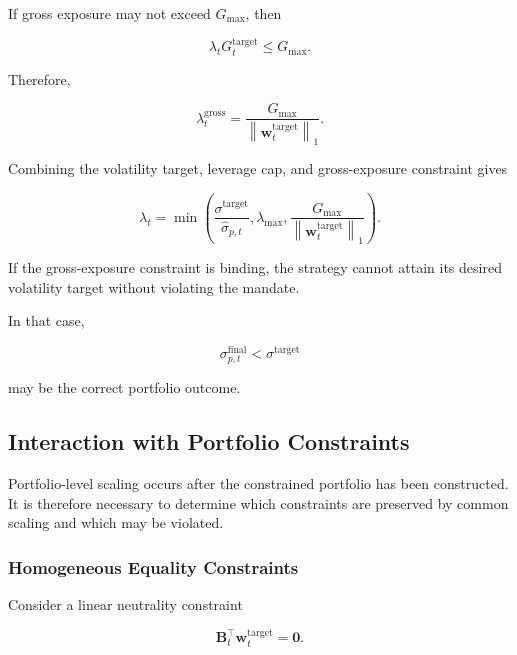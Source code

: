 \documentclass[11pt,a4paper]{article}
\begin{document}
If gross exposure may not exceed $G_{\max}$, then

\begin{equation}
\lambda_t
G_t^{\mathrm{target}}
\leq
G_{\max}.
\end{equation}

Therefore,

\begin{equation}
\boxed{
\lambda_t^{\mathrm{gross}}
=
\frac{
G_{\max}
}{
\left\|
\mathbf{w}_t^{\mathrm{target}}
\right\|_1
}.
}
\end{equation}

Combining the volatility target, leverage cap, and gross-exposure constraint
gives

\begin{equation}
\boxed{
\lambda_t
=
\min
\left(
\frac{
\sigma^{\mathrm{target}}
}{
\widehat{\sigma}_{p,t}
},
\lambda_{\max},
\frac{
G_{\max}
}{
\left\|
\mathbf{w}_t^{\mathrm{target}}
\right\|_1
}
\right).
}
\end{equation}

If the gross-exposure constraint is binding, the strategy cannot attain its
desired volatility target without violating the mandate.

In that case,

\begin{equation}
\boxed{
\sigma_{p,t}^{\mathrm{final}}
<
\sigma^{\mathrm{target}}
}
\end{equation}

may be the correct portfolio outcome.


\subsection{Interaction with Portfolio Constraints}
\label{subsec:risk_scaling_constraints}

Portfolio-level scaling occurs after the constrained portfolio has been
constructed. It is therefore necessary to determine which constraints are
preserved by common scaling and which may be violated.


\subsubsection{Homogeneous Equality Constraints}

Consider a linear neutrality constraint

\begin{equation}
\mathbf{B}_t^\top
\mathbf{w}_t^{\mathrm{target}}
=
\mathbf{0}.
\end{equation}
\end{document}
